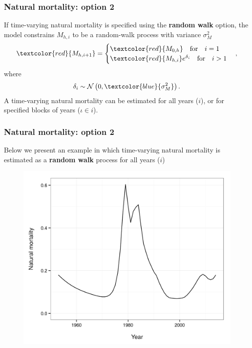 \documentclass{beamer}
\begin{document}

\begin{frame}
\frametitle{Natural mortality: option 2}
If time-varying natural mortality is specified using the {\bf random walk}
option, the model constrains $M_{h,i}$ to be a random-walk process with variance
$\sigma^2_M$
\begin{equation*}
  \textcolor{red}{M_{h,i+1}} = 
  \begin{cases}
    \textcolor{red}{M_{0,h}} \quad \text{for} \quad i=1\\
    \textcolor{red}{M_{h,i}} e^{\delta_i} \quad \text{for} \quad i>1
  \end{cases},
\end{equation*}
where
\begin{equation*}
  \delta_i \sim \mathcal{N} \left( 0, \textcolor{blue}{\sigma^2_M} \right).
\end{equation*}
A time-varying natural mortality can be estimated for all years ($i$), or for
specified blocks of years ($\iota \in i$).
\end{frame}


\begin{frame}
\frametitle{Natural mortality: option 2}
Below we present an example in which time-varying natural mortality is estimated
as a {\bf random walk} process for all years ($i$)
\begin{figure}[!htbp]
  \centering
  \includegraphics[width=0.6\linewidth]{figure/M_t_walk.png}
\end{figure}
\end{frame}

\end{document}
